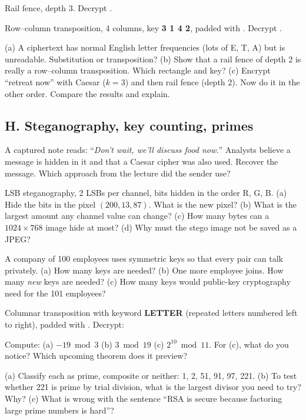 \q Rail fence, depth 3. Decrypt .

\q Row--column transposition, 4 columns, key \textbf{3 1 4 2}, padded with . Decrypt .

\q (a) A ciphertext has normal English letter frequencies (lots of E, T, A) but is unreadable. Substitution or transposition?
(b) Show that a rail fence of depth 2 is really a row--column transposition. Which rectangle and key?
(c) Encrypt ``retreat now'' with Caesar ($k=3$) and then rail fence (depth 2). Now do it in the other order. Compare the results and explain.

\subsection*{H. Steganography, key counting, primes}

\q A captured note reads: ``\emph{Don't wait, we'll discuss food now.}'' Analysts believe a message is hidden in it and that a Caesar cipher was also used. Recover the message. Which approach from the lecture did the sender use?

\q LSB steganography, 2 LSBs per channel, bits hidden in the order R, G, B.
(a) Hide the bits  in the pixel $(200, 13, 87)$. What is the new pixel?
(b) What is the largest amount any channel value can change?
(c) How many bytes can a $1024\times768$ image hide at most?
(d) Why must the stego image not be saved as a JPEG?

\q A company of 100 employees uses symmetric keys so that every pair can talk privately.
(a) How many keys are needed? (b) One more employee joins. How many \emph{new} keys are needed?
(c) How many keys would public-key cryptography need for the 101 employees?

\q Columnar transposition with keyword \textbf{LETTER} (repeated letters numbered left to right), padded with . Decrypt:
\begin{center}\end{center}

\q Compute: (a) $-19 \bmod 3$ \quad (b) $3 \bmod 19$ \quad (c) $2^{10} \bmod 11$. For (c), what do you notice? Which upcoming theorem does it preview?

\q (a) Classify each as prime, composite or neither: 1, 2, 51, 91, 97, 221.
(b) To test whether 221 is prime by trial division, what is the largest divisor you need to try? Why?
(c) What is wrong with the sentence ``RSA is secure because factoring large prime numbers is hard''?

